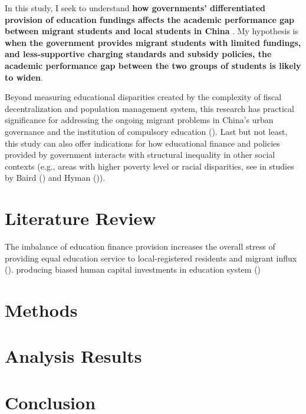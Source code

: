 \documentclass[
  man,
  floatsintext,
  longtable,
  nolmodern,
  notxfonts,
  notimes,
  colorlinks=true,linkcolor=blue,citecolor=blue,urlcolor=blue]{apa7}
\begin{document}
In this study, I seek to understand \textbf{how governments'
differentiated provision of education fundings affects the academic
performance gap between migrant students and local students in China} .
My hypothesis is \textbf{when the government provides migrant students
with limited fundings, and less-supportive charging standards and
subsidy policies, the academic performance gap between the two groups of
students is likely to widen}.

Beyond measuring educational disparities created by the complexity of
fiscal decentralization and population management system, this research
has practical significance for addressing the ongoing migrant problems
in China's urban governance and the institution of compulsory education
(). Last but not least, this
study can also offer indications for how educational finance and
policies provided by government interacts with structural inequality in
other social contexts (e.g., areas with higher poverty level or racial
disparities, see in studies by Baird
() and Hyman
()).

\section{Literature Review}\label{literature-review}

The imbalance of education finance provision increases the overall
stress of providing equal education service to local-registered
residents and migrant influx
(). producing biased human capital investments in education system
()

\section{Methods}\label{methods}

\section{Analysis Results}\label{analysis-results}

\section{Conclusion}\label{conclusion}
\end{document}
